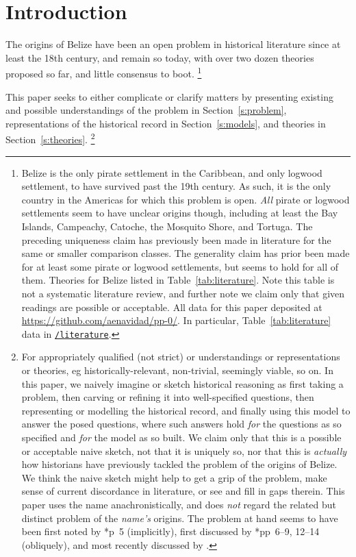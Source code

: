 
%
%
%
\section{Introduction}
\label{s:intro}
	The origins of Belize have been an open problem in historical literature since at least the 18th century, and remain so today, with over two dozen theories proposed so far, and little consensus to boot.%
	\footnote{Belize is the only pirate settlement in the Caribbean, and only logwood settlement, to have survived past the 19th century. As such, it is the only country in the Americas for which this problem is open. \emph{All} pirate or logwood settlements seem to have unclear origins though, including at least the Bay Islands, Campeachy, Catoche, the Mosquito Shore, and Tortuga. The preceding uniqueness claim has previously been made in literature for the same or smaller comparison classes. The generality claim has prior been made for at least some pirate or logwood settlements, but seems to hold for all of them. Theories for Belize listed in Table~\ref{tab:literature}. Note this table is not a systematic literature review, and further note we claim only that given readings are possible or acceptable. All data for this paper deposited at \url{https://github.com/aenavidad/pp-0/}. In particular, Table~\ref{tab:literature} data in \href{https://github.com/aenavidad/pp-0/tree/main/literature}{\nolinkurl{/literature}}.}
	
	This paper seeks to either complicate or clarify matters by presenting existing and possible understandings of the problem in Section~\ref{s:problem}, representations of the historical record in Section~\ref{s:models}, and theories in Section~\ref{s:theories}.%
	\footnote{For appropriately qualified (not strict)  or  understandings or representations or theories, eg historically-relevant, non-trivial, seemingly viable, so on. In this paper, we naively imagine or sketch historical reasoning as first taking a problem, then carving or refining it into well-specified questions, then representing or modelling the historical record, and finally using this model to answer the posed questions, where such answers hold \emph{for} the questions as so specified and \emph{for} the model as so built. We claim only that this is a possible or acceptable naive sketch, not that it is uniquely so, nor that this is \emph{actually} how historians have previously tackled the problem of the origins of Belize. We think the naive sketch might help to get a grip of the problem, make sense of current discordance in literature, or see and fill in gaps therein. This paper uses the name  anachronistically, and does \emph{not} regard the related but distinct problem of the \emph{name's} origins. The problem at hand seems to have been first noted by \cite{alm26}*{p~5} (implicitly), first discussed by \cite{nun77}*{pp~6--9, 12--14} (obliquely), and most recently discussed by .} %
%
%
%
